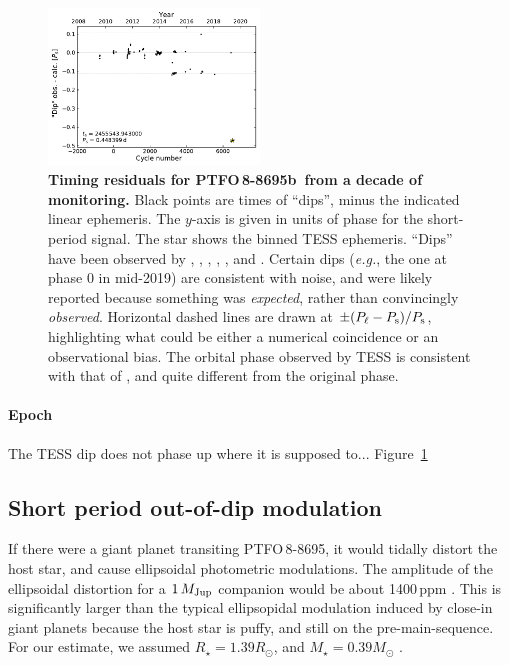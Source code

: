 \documentclass[12pt,twocolumn,tighten]{aastex62}
\newcommand{\ptfo}{PTFO$\,$8-8695}
\newcommand{\ptfob}{PTFO$\,$8-8695b}
\begin{document}
\begin{figure}[t]
	\begin{center}
		\leavevmode
		\includegraphics[width=0.5\textwidth]{f5.pdf}
	\end{center}
	\vspace{-0.7cm}
	\caption{
		{\bf Timing residuals for \ptfob\ from a decade of monitoring.}
		Black points are times of ``dips'', minus the indicated linear
		ephemeris.  The $y$-axis is given in units of phase for the
		short-period signal.  The star shows the binned TESS ephemeris.
		``Dips'' have been observed by \citet{van_eyken_ptf_2012},
		\citet{ciardi_followup_2015}, \citet{yu_tests_2015},
		\citet{raetz_yeti_2016}, \citet{onitsuka_multi-color_2017}, and
		\citet{tanimoto_evidence_2020}.  Certain dips ({\it e.g.}, the one
		at phase 0 in mid-2019) are consistent with noise, and were likely
		reported because something was {\it expected}, rather than
		convincingly {\it observed}.  Horizontal dashed lines are drawn at
		$\pm (P_{\rm \ell} - P_{\rm s})/P_{\rm s}$, highlighting what
		could be either a numerical coincidence or an observational bias.
		The orbital phase observed by TESS is consistent with that of
		\citet{tanimoto_evidence_2020}, and quite different from the
		original phase.
		\label{fig:o_minus_c}
	}
\end{figure}

\paragraph{Epoch}
The TESS dip does not phase up where it is supposed to...
Figure~\ref{fig:o_minus_c}

\subsection{Short period out-of-dip modulation}
If there were a giant planet transiting \ptfo, it would tidally
distort the host star, and cause ellipsoidal photometric modulations.
The amplitude of the ellipsoidal distortion for a $1\,M_{\rm Jup}$
companion would be about 1400$\,$ppm
\citep{shporer_astrophysics_2017}.  This is significantly larger than
the typical ellipsopidal modulation induced by close-in giant planets
because the host star is puffy, and still on the pre-main-sequence.
For our estimate, we assumed $R_\star = 1.39 R_\odot$, and $M_\star =
0.39 M_\odot$ \citep{van_eyken_ptf_2012}. 
\end{document}
